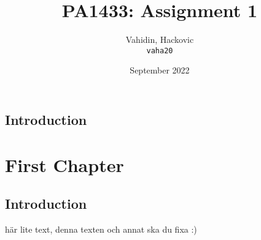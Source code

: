 \documentclass{article}
\title{PA1433: Assignment 1}
\author{
  Vahidin, Hackovic\\
  \texttt{vaha20}
}
\date{September 2022}
\begin{document}
    \maketitle
    \section{Introduction}

    \chapter{First Chapter}
    \section{Introduction}


    här lite text, denna texten och annat ska du fixa :)
\end{document}
